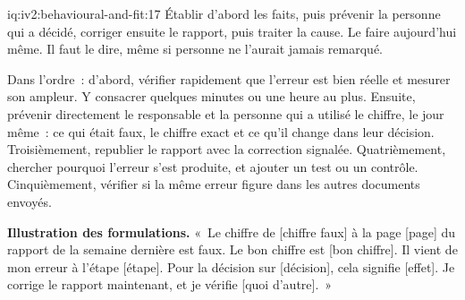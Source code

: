 \begin{solution}{iq:iv2:behavioural-and-fit:17}
Établir d'abord les faits, puis prévenir la personne qui a décidé, corriger ensuite le rapport, puis traiter la cause. Le faire aujourd'hui même. Il faut le dire, même si personne ne l'aurait jamais remarqué.

Dans l'ordre~: d'abord, vérifier rapidement que l'erreur est bien réelle et mesurer son ampleur. Y consacrer quelques minutes ou une heure au plus. Ensuite, prévenir directement le responsable et la personne qui a utilisé le chiffre, le jour même~: ce qui était faux, le chiffre exact et ce qu'il change dans leur décision. Troisièmement, republier le rapport avec la correction signalée. Quatrièmement, chercher pourquoi l'erreur s'est produite, et ajouter un test ou un contrôle. Cinquièmement, vérifier si la même erreur figure dans les autres documents envoyés.

\textbf{Illustration des formulations.} «~Le chiffre de [chiffre faux] à la page [page] du rapport de la semaine dernière est faux. Le bon chiffre est [bon chiffre]. Il vient de mon erreur à l'étape [étape]. Pour la décision sur [décision], cela signifie [effet]. Je corrige le rapport maintenant, et je vérifie [quoi d'autre].~»

\end{solution}

